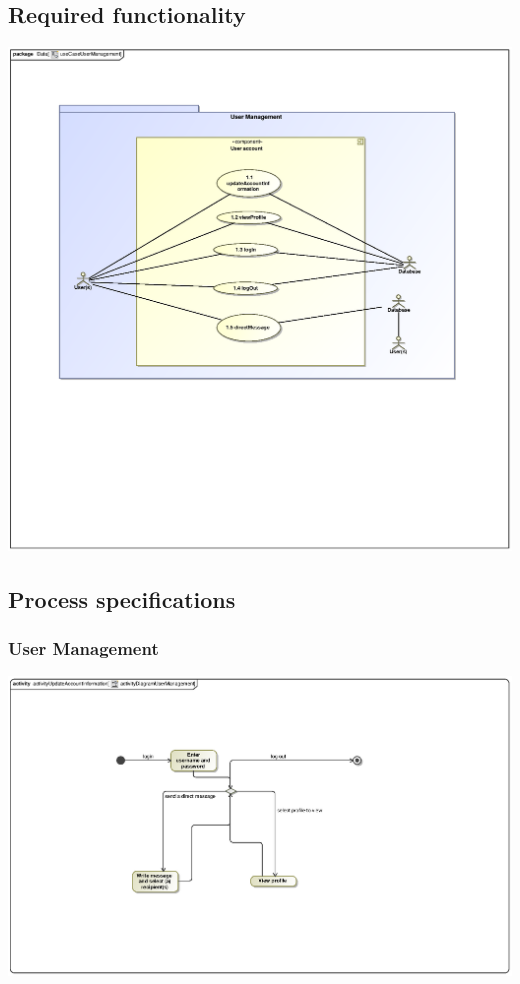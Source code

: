 \documentclass[hidelinks, 12pt, oneside]{article}
\begin{document}
\subsection{Required functionality} 
\includegraphics[scale=.9]{Sean/useCaseUserManagement.eps}\\

\subsection{Process specifications}
\subsubsection{User Management}
\includegraphics[scale=.9]{Sean/activityDiagramUserManagement.eps}\\
\end{document}
